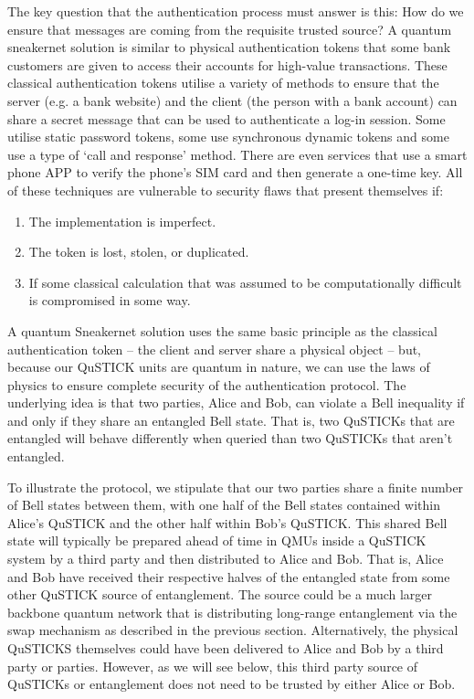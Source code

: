 \documentclass[twocolumn, aps, rmp, amsmath, amssymb, nofootinbib, superscriptaddress, longbibliography, floatfix, table-of-contents, eqsecnum]{revtex4-2}
\begin{document}
The key question that the authentication process must answer is this: How do we ensure that messages are coming from the requisite trusted source? A quantum sneakernet solution is similar to physical authentication tokens that some bank customers are given to access their accounts for high-value transactions. These classical authentication tokens utilise a variety of methods to ensure that the server (e.g. a bank website) and the client (the person with a bank account) can share a secret message that can be used to authenticate a log-in session. Some utilise static password tokens, some use synchronous dynamic tokens and some use a type of `call and response' method. There are even services that use a smart phone APP to verify the phone's SIM card and then generate a one-time key. All of these techniques are vulnerable to security flaws that present themselves if:
\begin{enumerate}
\item The implementation is imperfect.
\item The token is lost, stolen, or duplicated.
\item If some classical calculation that was assumed to be computationally difficult is compromised in some way. 
\end{enumerate}

A quantum Sneakernet solution uses the same basic principle as the classical authentication token -- the client and server share a physical object -- but, because our QuSTICK units are quantum in nature, we can use the laws of physics to ensure complete security of the authentication protocol. The underlying idea is that two parties, Alice and Bob, can violate a Bell inequality if and only if they share an entangled Bell state. That is, two QuSTICKs that are entangled will behave differently when queried than two QuSTICKs that aren't entangled.

To illustrate the protocol, we stipulate that our two parties share a finite number of Bell states between them, with one half of the Bell states contained within Alice's QuSTICK and the other half within Bob's QuSTICK. This shared Bell state will typically be prepared ahead of time in QMUs inside a QuSTICK system by a third party and then distributed to Alice and Bob. That is, Alice and Bob have received their respective halves of the entangled state from some other QuSTICK source of entanglement. The source could be a much larger backbone quantum network that is distributing long-range entanglement via the swap mechanism as described in the previous section. Alternatively, the physical QuSTICKS themselves could have been delivered to Alice and Bob by a third party or parties. However, as we will see below, this third party source of QuSTICKs or entanglement does not need to be trusted by either Alice or Bob.
\end{document}
